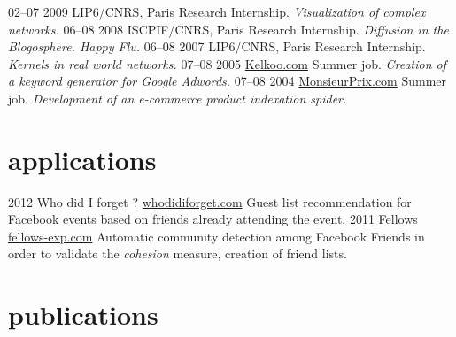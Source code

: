 \documentclass[]{chandan-cv}
\begin{document}
\begin{entrylist}
  \entry
    {02–07 2009}
    {LIP6/CNRS, Paris}
    {Research Internship.}
    {\emph{Visualization of complex networks.}}
  \entry
    {06–08 2008}
    {ISCPIF/CNRS, Paris}
    {Research Internship.}
    {\emph{Diffusion in the Blogosphere. Happy Flu.}}
  \entry
    {06–08 2007}
    {LIP6/CNRS, Paris}
    {Research Internship.}
    {\emph{Kernels in real world networks.}}
  \entry
    {07–08 2005}
    {\href{http://www.kelkoo.com}{Kelkoo.com}}
    {Summer job.}
    {\emph{Creation of a keyword generator for Google Adwords.}}
  \entry
    {07–08 2004}
    {\href{http://www.monsieurprix.com}{MonsieurPrix.com}}
    {Summer job.}
    {\emph{Development of an e-commerce product indexation spider.}}
\end{entrylist}

\section{applications}

\begin{entrylist}
  \entry
    {2012}
    {Who did I forget ?}
    {\href{http://whodidiforget.com}{whodidiforget.com}}
    {Guest list recommendation for Facebook events based on friends already attending the event.}
  \entry
    {2011}
    {Fellows}
    {\href{http://fellows-exp.com}{fellows-exp.com}}
    {Automatic community detection among Facebook Friends in order to validate the \emph{cohesion} measure, creation of friend lists.}
\end{entrylist}

\section{publications}
\end{document}
